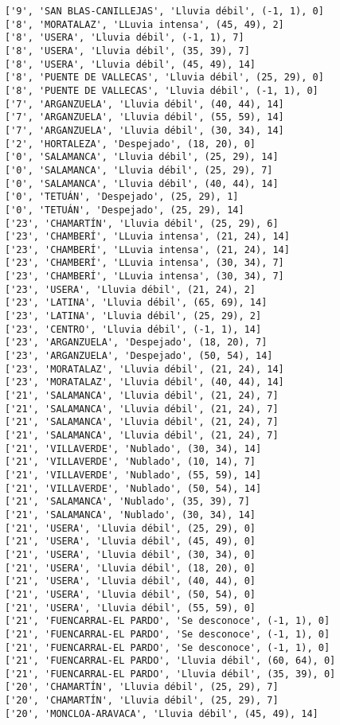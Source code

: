 \documentclass[11pt]{article}
\begin{document}
\begin{Verbatim}[commandchars=\\\{\}]
['9', 'SAN BLAS-CANILLEJAS', 'Lluvia débil', (-1, 1), 0]
['8', 'MORATALAZ', 'LLuvia intensa', (45, 49), 2]
['8', 'USERA', 'Lluvia débil', (-1, 1), 7]
['8', 'USERA', 'Lluvia débil', (35, 39), 7]
['8', 'USERA', 'Lluvia débil', (45, 49), 14]
['8', 'PUENTE DE VALLECAS', 'Lluvia débil', (25, 29), 0]
['8', 'PUENTE DE VALLECAS', 'Lluvia débil', (-1, 1), 0]
['7', 'ARGANZUELA', 'Lluvia débil', (40, 44), 14]
['7', 'ARGANZUELA', 'Lluvia débil', (55, 59), 14]
['7', 'ARGANZUELA', 'Lluvia débil', (30, 34), 14]
['2', 'HORTALEZA', 'Despejado', (18, 20), 0]
['0', 'SALAMANCA', 'Lluvia débil', (25, 29), 14]
['0', 'SALAMANCA', 'Lluvia débil', (25, 29), 7]
['0', 'SALAMANCA', 'Lluvia débil', (40, 44), 14]
['0', 'TETUÁN', 'Despejado', (25, 29), 1]
['0', 'TETUÁN', 'Despejado', (25, 29), 14]
['23', 'CHAMARTÍN', 'Lluvia débil', (25, 29), 6]
['23', 'CHAMBERÍ', 'LLuvia intensa', (21, 24), 14]
['23', 'CHAMBERÍ', 'LLuvia intensa', (21, 24), 14]
['23', 'CHAMBERÍ', 'LLuvia intensa', (30, 34), 7]
['23', 'CHAMBERÍ', 'LLuvia intensa', (30, 34), 7]
['23', 'USERA', 'Lluvia débil', (21, 24), 2]
['23', 'LATINA', 'Lluvia débil', (65, 69), 14]
['23', 'LATINA', 'Lluvia débil', (25, 29), 2]
['23', 'CENTRO', 'Lluvia débil', (-1, 1), 14]
['23', 'ARGANZUELA', 'Despejado', (18, 20), 7]
['23', 'ARGANZUELA', 'Despejado', (50, 54), 14]
['23', 'MORATALAZ', 'Lluvia débil', (21, 24), 14]
['23', 'MORATALAZ', 'Lluvia débil', (40, 44), 14]
['21', 'SALAMANCA', 'Lluvia débil', (21, 24), 7]
['21', 'SALAMANCA', 'Lluvia débil', (21, 24), 7]
['21', 'SALAMANCA', 'Lluvia débil', (21, 24), 7]
['21', 'SALAMANCA', 'Lluvia débil', (21, 24), 7]
['21', 'VILLAVERDE', 'Nublado', (30, 34), 14]
['21', 'VILLAVERDE', 'Nublado', (10, 14), 7]
['21', 'VILLAVERDE', 'Nublado', (55, 59), 14]
['21', 'VILLAVERDE', 'Nublado', (50, 54), 14]
['21', 'SALAMANCA', 'Nublado', (35, 39), 7]
['21', 'SALAMANCA', 'Nublado', (30, 34), 14]
['21', 'USERA', 'Lluvia débil', (25, 29), 0]
['21', 'USERA', 'Lluvia débil', (45, 49), 0]
['21', 'USERA', 'Lluvia débil', (30, 34), 0]
['21', 'USERA', 'Lluvia débil', (18, 20), 0]
['21', 'USERA', 'Lluvia débil', (40, 44), 0]
['21', 'USERA', 'Lluvia débil', (50, 54), 0]
['21', 'USERA', 'Lluvia débil', (55, 59), 0]
['21', 'FUENCARRAL-EL PARDO', 'Se desconoce', (-1, 1), 0]
['21', 'FUENCARRAL-EL PARDO', 'Se desconoce', (-1, 1), 0]
['21', 'FUENCARRAL-EL PARDO', 'Se desconoce', (-1, 1), 0]
['21', 'FUENCARRAL-EL PARDO', 'Lluvia débil', (60, 64), 0]
['21', 'FUENCARRAL-EL PARDO', 'Lluvia débil', (35, 39), 0]
['20', 'CHAMARTÍN', 'Lluvia débil', (25, 29), 7]
['20', 'CHAMARTÍN', 'Lluvia débil', (25, 29), 7]
['20', 'MONCLOA-ARAVACA', 'Lluvia débil', (45, 49), 14]

\end{Verbatim}
\end{document}
